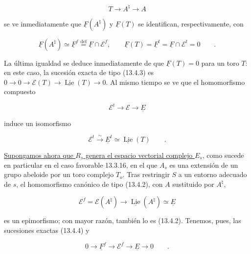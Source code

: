 \begin{equation*}
 T\longrightarrow A^\natural\longrightarrow A
\end{equation*}

\noindent
se ve inmediatamente que $\underline F(A^\natural)$ y $\underline F(T)$
se identifican, respectivamente, con

\begin{equation}\tag{13.4.10}
 \underline F(A^\natural)\simeq
 \underline F^f\stackrel{\mathrm{def}}{=}
 \underline F\cap\mathcal E^f,
 \qquad
 \underline F(T)=\underline F^t=
 \underline F\cap\mathcal E^t=0\qquad .
\end{equation}

\noindent
La última igualdad se deduce inmediatamente de que
$\underline F(T)=0$ para un toro $T$: en este caso, la sucesión exacta
de tipo (13.4.3) es
$0\longrightarrow0\longrightarrow\mathcal E(T)
\longrightarrow\underline{\operatorname{Lie}}(T)\longrightarrow0$.
Al mismo tiempo se ve que el homomorfismo compuesto

\begin{equation*}
 \mathcal E^t\longrightarrow\mathcal E\longrightarrow\underline E
\end{equation*}

\noindent
induce un isomorfismo

\begin{equation}\tag{13.4.11}
 \mathcal E^t\stackrel{\sim}{\longrightarrow}\underline E^t
 \simeq\underline{\operatorname{Lie}}(T)\qquad .
\end{equation}

\noindent
\underline{Supongamos ahora que $R_s$ genera el espacio vectorial
complejo $E_s$}, como sucede en particular en el caso favorable 13.3.16,
en el que $A_s$ es una extensión de un grupo abeloide por un toro
complejo $T_o$. Tras restringir $S$ a un entorno adecuado de $s$, el
homomorfismo canónico de tipo (13.4.2), con $A$ sustituido por
$A^\natural$,

\begin{equation*}
 \mathcal E^f=\mathcal E(A^\natural)
 \longrightarrow\underline{\operatorname{Lie}}(A^\natural)
 \simeq\underline E
\end{equation*}

\noindent
es un epimorfismo; con mayor razón, también lo es (13.4.2). Tenemos,
pues, las sucesiones exactas (13.4.4) y

\begin{equation}\tag{13.4.12}
 0\longrightarrow\underline F^f\longrightarrow\mathcal E^f
 \longrightarrow\underline E\longrightarrow0\qquad .
\end{equation}

